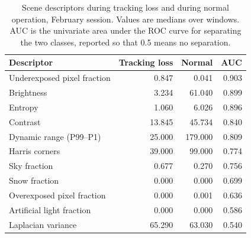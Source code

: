 \begin{table}[t]
\caption{Scene descriptors during tracking loss and during normal operation, February session. Values are medians over windows. AUC is the univariate area under the ROC curve for separating the two classes, reported so that 0.5 means no separation.}\label{tab:descriptors}
\begin{tabular}{lrrr}
\toprule
Descriptor & Tracking loss & Normal & AUC \\
\midrule
Underexposed pixel fraction & 0.847 & 0.041 & 0.903 \\
Brightness & 3.234 & 61.040 & 0.899 \\
Entropy & 1.060 & 6.026 & 0.896 \\
Contrast & 13.845 & 45.734 & 0.840 \\
Dynamic range (P99--P1) & 25.000 & 179.000 & 0.809 \\
Harris corners & 39.000 & 99.000 & 0.774 \\
Sky fraction & 0.677 & 0.270 & 0.756 \\
Snow fraction & 0.000 & 0.000 & 0.699 \\
Overexposed pixel fraction & 0.000 & 0.001 & 0.636 \\
Artificial light fraction & 0.000 & 0.000 & 0.586 \\
Laplacian variance & 65.290 & 63.030 & 0.540 \\
\bottomrule
\end{tabular}
\end{table}
